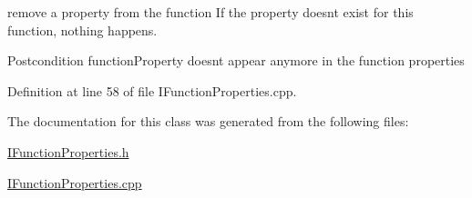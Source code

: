 remove a property from the function If the property doesn\textquotesingle{}t exist for this function, nothing happens.

\begin{DoxyPostcond}{Postcondition}
function\+Property doesn\textquotesingle{}t appear anymore in the function properties 
\end{DoxyPostcond}


Definition at line 58 of file I\+Function\+Properties.\+cpp.



The documentation for this class was generated from the following files\+:\begin{DoxyCompactItemize}
\item 
\hyperlink{IFunctionProperties_8h}{I\+Function\+Properties.\+h}\item 
\hyperlink{IFunctionProperties_8cpp}{I\+Function\+Properties.\+cpp}\end{DoxyCompactItemize}

